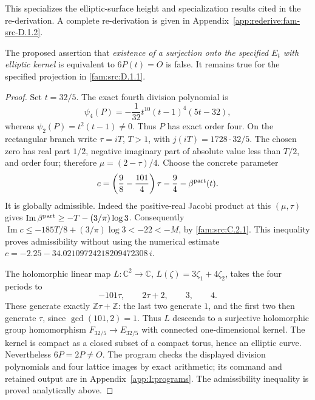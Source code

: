 This specializes the elliptic-surface height and specialization results cited in the re-derivation. A complete re-derivation is given in Appendix~\ref{app:rederive:fam-src-D.1.2}.


\begin{theorem}[counterexample]\label{fam:src:D.1.3}\label{fam:st:D.1.3}
The proposed assertion that \emph{existence of a surjection onto the
specified \(E_t\) with elliptic kernel} is equivalent to \(6P(t)=O\)
is false. It remains true for the specified projection in \ref{fam:src:D.1.1}.
\end{theorem}

\begin{proof}
Set \(t=32/5\). The exact fourth division polynomial is
\[
 \psi_4(P)=-\frac1{32}t^{10}(t-1)^4(5t-32),
\]
whereas \(\psi_2(P)=t^2(t-1)\ne0\). Thus \(P\) has exact order four.
On the rectangular branch write \(\tau=iT\), \(T>1\), with
\(j(iT)=1728\cdot32/5\). The chosen zero has real part \(1/2\), negative
imaginary part of absolute value less than \(T/2\), and order four;
therefore \(\mu=(2-\tau)/4\). Choose the concrete parameter
\[
 c=\left(\frac98-\frac{101}{4}\right)\tau-\frac94
       -\beta^{\rm part}(t).
\]
It is globally admissible. Indeed the positive-real Jacobi product at this
\((\mu,\tau)\) gives
\(\operatorname{Im}\beta^{\rm part}\geq-T-(3/\pi)\log3\).
Consequently
\(\operatorname{Im}c\leq-185T/8+(3/\pi)\log3<-22<-M\), by \ref{fam:src:C.2.1}.
This inequality proves admissibility without using the numerical estimate
\(c=-2.25-34.02109724218209472308\,i\).

The holomorphic linear map \(L:\mathbb C^2\to\mathbb C\),
\(L(\zeta)=3\zeta_1+4\zeta_2\), takes the four periods to
\[
 -101\tau,\qquad2\tau+2,\qquad3,\qquad4.
\]
These generate exactly \(\mathbb Z\tau+\mathbb Z\): the last two generate
\(1\), and the first two then generate \(\tau\), since
\(\gcd(101,2)=1\). Thus \(L\) descends to a surjective holomorphic group
homomorphism \(F_{32/5}\to E_{32/5}\) with connected one-dimensional
kernel. The kernel is compact as a closed subset of a compact torus,
hence an elliptic curve. Nevertheless \(6P=2P\ne O\).
The program  checks the displayed
division polynomials and four lattice images by exact arithmetic; its
command and retained output are in Appendix~\ref{app:I:programs}.
The admissibility inequality is proved analytically above.
\end{proof}


